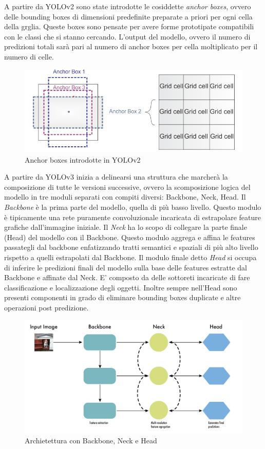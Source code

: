 \documentclass[12pt,a4paper,openright,twoside]{report}
\begin{document}
A partire da YOLOv2 sono state introdotte le cosiddette \emph{anchor boxes}, ovvero delle bounding boxes di dimensioni predefinite preparate a priori per ogni cella della grglia. Queste boxes sono pensate per avere forme prototipate compatibili con le classi che si stanno cercando. L'output del modello, ovvero il numero di predizioni totali sarà pari al numero di anchor boxes per cella moltiplicato per il numero di celle.
\begin{figure}[h]
\centering
\includegraphics[width=\linewidth]{anchor.png}
\caption{Anchor boxes introdotte in YOLOv2}
\end{figure}
A partire da YOLOv3 inizia a delinearsi una struttura che marcherà la composizione di tutte le versioni successive, ovvero la scomposizione logica del modello in tre moduli separati con compiti diversi: Backbone, Neck, Head.
Il \emph{Backbone} è la prima parte del modello, quella di più basso livello. Questo modulo è tipicamente una rete puramente convoluzionale incaricata di estrapolare feature grafiche dall'immagine iniziale.
Il \emph{Neck} ha lo scopo di collegare la parte finale (Head) del modello con il Backbone. Questo modulo aggrega e affina le features passategli dal backbone enfatizzando tratti semantici e spaziali di più alto livello rispetto a quelli estrapolati dal Backbone. 
Il modulo finale detto \emph{Head} si occupa di inferire le predizioni finali del modello sulla base delle features estratte dal Backbone e affinate dal Neck. E' composto da delle sottoreti incaricate di fare classificazione e localizzazione degli oggetti. Inoltre sempre nell'Head sono presenti componenti in grado di eliminare bounding boxes duplicate e altre operazioni post predizione.
\begin{figure}[h]
\centering
\includegraphics[width=\linewidth]{backbone_neck_head.png}
\caption{Archietettura con Backbone, Neck e Head}
\end{figure}
\end{document}
